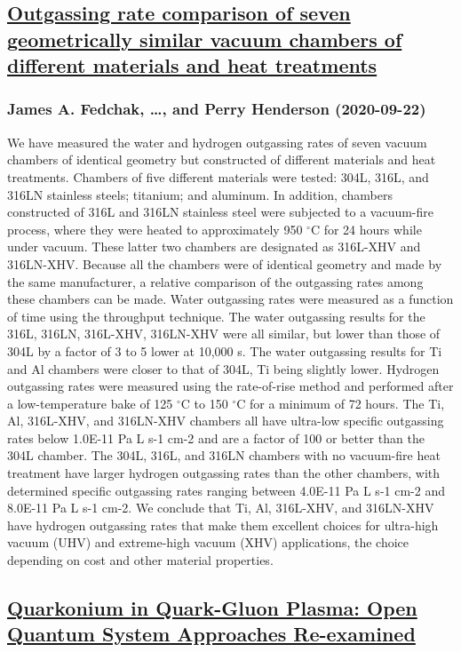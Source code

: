 {\subsection*{\href{http://arxiv.org/abs/2009.10560v1}{Outgassing rate comparison of seven geometrically similar vacuum  chambers of different materials and heat treatments}}
\subsubsection*{James A. Fedchak, \dots, and Perry Henderson (2020-09-22)}
We have measured the water and hydrogen outgassing rates of seven vacuum
chambers of identical geometry but constructed of different materials and heat
treatments. Chambers of five different materials were tested: 304L, 316L, and
316LN stainless steels; titanium; and aluminum. In addition, chambers
constructed of 316L and 316LN stainless steel were subjected to a vacuum-fire
process, where they were heated to approximately 950 $^{\circ}$C for 24 hours while
under vacuum. These latter two chambers are designated as 316L-XHV and
316LN-XHV. Because all the chambers were of identical geometry and made by the
same manufacturer, a relative comparison of the outgassing rates among these
chambers can be made. Water outgassing rates were measured as a function of
time using the throughput technique. The water outgassing results for the 316L,
316LN, 316L-XHV, 316LN-XHV were all similar, but lower than those of 304L by a
factor of 3 to 5 lower at 10,000 s. The water outgassing results for Ti and Al
chambers were closer to that of 304L, Ti being slightly lower. Hydrogen
outgassing rates were measured using the rate-of-rise method and performed
after a low-temperature bake of 125 $^{\circ}$C to 150 $^{\circ}$C for a minimum of 72
hours. The Ti, Al, 316L-XHV, and 316LN-XHV chambers all have ultra-low specific
outgassing rates below 1.0E-11 Pa L s-1 cm-2 and are a factor of 100 or better
than the 304L chamber. The 304L, 316L, and 316LN chambers with no vacuum-fire
heat treatment have larger hydrogen outgassing rates than the other chambers,
with determined specific outgassing rates ranging between 4.0E-11 Pa L s-1 cm-2
and 8.0E-11 Pa L s-1 cm-2. We conclude that Ti, Al, 316L-XHV, and 316LN-XHV
have hydrogen outgassing rates that make them excellent choices for ultra-high
vacuum (UHV) and extreme-high vacuum (XHV) applications, the choice depending
on cost and other material properties.

\subsection*{\href{http://arxiv.org/abs/2009.10559v1}{Quarkonium in Quark-Gluon Plasma: Open Quantum System Approaches  Re-examined}}
}
